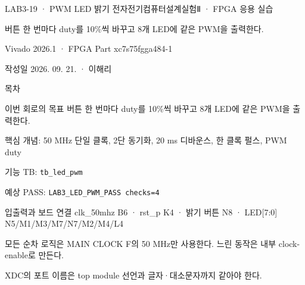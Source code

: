 

\renewcommand{\small}{\fontsize{8.7}{10.5}\selectfont}
\setlength{\leftmargini}{1.35em}

\begin{frame}{LAB3-19 · PWM LED 밝기}
\small
전자전기컴퓨터설계실험Ⅱ · FPGA 응용 실습\par\vspace{0.28cm}
버튼 한 번마다 duty를 10\%씩 바꾸고 8개 LED에 같은 PWM을 출력한다.\par\vspace{0.28cm}
Vivado 2026.1 · FPGA Part xc7s75fgga484-1\par\vspace{0.28cm}
작성일 2026. 09. 21. · 이해리
\end{frame}

\begin{frame}[label=lab3-contents]{목차}
\small
{}\par\vspace{0.28cm}
\par\vspace{0.28cm}
\par\vspace{0.28cm}
\par\vspace{0.28cm}
\par\vspace{0.28cm}
\end{frame}

\begin{frame}[label=goal]{이번 회로의 목표}
\small
버튼 한 번마다 duty를 10\%씩 바꾸고 8개 LED에 같은 PWM을 출력한다.\par\vspace{0.28cm}
핵심 개념: 50 MHz 단일 클록, 2단 동기화, 20 ms 디바운스, 한 클록 펄스, PWM duty\par\vspace{0.28cm}
기능 TB: \texttt{tb\_led\_pwm}\par\vspace{0.18cm}
예상 PASS: \texttt{LAB3\_LED\_PWM\_PASS checks=4}
\end{frame}

\begin{frame}{입출력과 보드 연결}
\small
clk\_50mhz B6 · rst\_p K4 · 밝기 버튼 N8 · LED[7:0] N5/M1/M3/M7/N7/M2/M4/L4\par\vspace{0.32cm}
모든 순차 로직은 MAIN CLOCK F의 50 MHz만 사용한다. 느린 동작은 내부 clock-enable로 만든다.\par\vspace{0.28cm}
XDC의 포트 이름은 top module 선언과 글자·대소문자까지 같아야 한다.
\end{frame}

